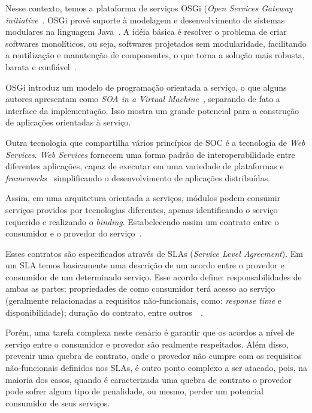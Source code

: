 Nesse contexto, temos a plataforma de serviços OSGi (\textit{Open Services Gateway initiative}~\cite{alliance2007osgi}. OSGi provê suporte à modelagem e desenvolvimento de sistemas modulares na linguagem Java~\cite{hall2010osgi}. A idéia básica é resolver o problema de criar softwares monolíticos, ou seja, softwares projetados sem modularidade, facilitando a reutilização e manutenção de  componentes, o que torna a solução mais robusta, barata e confiável~\cite{davis2009open}.

OSGi introduz um modelo de programação orientada a serviço, o que alguns autores apresentam como \textit{SOA in a Virtual Machine}~\cite{hall2010osgi}, separando de fato a interface da implementação. Isso mostra um grande potencial para a construção de aplicações orientadas à serviço.

Outra tecnologia que compartilha vários princípios de SOC é a tecnologia de \textit{Web Services}. \textit{Web Services} fornecem uma forma padrão de interoperabilidade entre diferentes aplicações, capaz de executar em uma variedade de plataformas e \textit{frameworks}~\cite{w3c2002ws} simplificando o desenvolvimento de aplicações distribuídas.

Assim, em uma arquitetura orientada a serviços, módulos podem consumir serviços providos por tecnologias diferentes, apenas identificando o serviço requerido e realizando o \textit{binding}. Estabelecendo assim um contrato entre o consumidor e o provedor do serviço~\cite{oracle2005ws}.

Esses contratos são especificados através de SLAs (\textit{Service Level Agreement}). Em um SLA temos basicamente uma descrição de um acordo entre o provedor e consumidor de um determinado serviço. Esse acordo define: responsabilidades de ambas as partes; propriedades de como consumidor terá acesso ao serviço (geralmente relacionadas a requisitos não-funcionais, como: \textit{response time} e disponibilidade); duração do contrato, entre outros~\cite{jin2002analysis}~\cite{slasoi}.

Porém, uma tarefa complexa neste cenário é garantir que os acordos a nível de serviço entre o consumidor e provedor são realmente respeitados. Além disso, prevenir uma quebra de contrato, onde o provedor não cumpre com os requisitos não-funcionais definidos nos SLAs, é outro ponto complexo a ser atacado, pois, na maioria dos casos, quando é caracterizada uma quebra de contrato o provedor pode sofrer algum tipo de penalidade, ou mesmo, perder um potencial consumidor de seus serviços.

